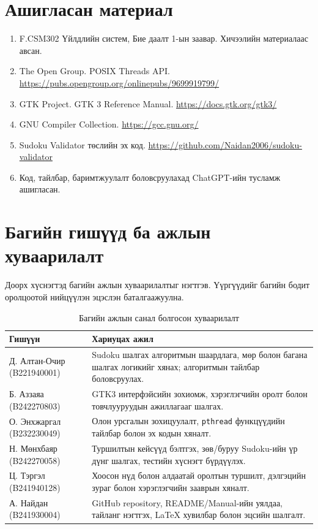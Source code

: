 \documentclass[12pt,a4paper]{report}
\newcommand{\repo}{\url{https://github.com/Naidan2006/sudoku-validator}}
\begin{document}
\chapter*{Ашигласан материал}
\begin{enumerate}
\item F.CSM302 Үйлдлийн систем, Бие даалт 1-ын заавар. Хичээлийн материалаас авсан.
\item The Open Group. POSIX Threads API. \url{https://pubs.opengroup.org/onlinepubs/9699919799/}
\item GTK Project. GTK 3 Reference Manual. \url{https://docs.gtk.org/gtk3/}
\item GNU Compiler Collection. \url{https://gcc.gnu.org/}
\item Sudoku Validator төслийн эх код. \repo
\item Код, тайлбар, баримтжуулалт боловсруулахад ChatGPT-ийн тусламж ашигласан.
\end{enumerate}

\chapter*{Багийн гишүүд ба ажлын хуваарилалт}
Доорх хүснэгтэд багийн ажлын хуваарилалтыг нэгтгэв. Үүргүүдийг багийн бодит оролцоотой нийцүүлэн эцэслэн баталгаажуулна.

\begin{longtable}{p{}p{}}
\caption{Багийн ажлын санал болгосон хуваарилалт}\\
\toprule
\textbf{Гишүүн} & \textbf{Хариуцах ажил}\\
\midrule
Д. Алтан-Очир (B221940001) & Sudoku шалгах алгоритмын шаардлага, мөр болон багана шалгах логикийг хянах; алгоритмын тайлбар боловсруулах.\\
Б. Аззаяа (B242270803) & GTK3 интерфэйсийн зохиомж, хэрэглэгчийн оролт болон товчлууруудын ажиллагааг шалгах.\\
О. Энхжаргал (B232230049) & Олон урсгалын зохицуулалт, \texttt{pthread} функцүүдийн тайлбар болон эх кодын хяналт.\\
Н. Мөнхбаяр (B242270058) & Туршилтын кейсүүд бэлтгэх, зөв/буруу Sudoku-ийн үр дүнг шалгах, тестийн хүснэгт бүрдүүлэх.\\
Ц. Тэргэл (B241940128) & Хоосон нүд болон алдаатай оролтын туршилт, дэлгэцийн зураг болон хэрэглэгчийн зааврын хяналт.\\
А. Найдан (B241930004) & GitHub repository, README/Manual-ийн уялдаа, тайланг нэгтгэх, LaTeX хувилбар болон эцсийн шалгалт.\\
\bottomrule
\end{longtable}
\end{document}
